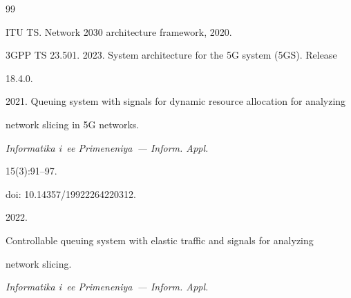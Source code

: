 




\renewcommand{\bibname}{\protect\rmfamily References}







{\small\frenchspacing


{ %




\begin{thebibliography}{99}







ITU TS. Network 2030 architecture framework, 2020.







3GPP TS 23.501. 2023. System architecture for the 5G system (5GS). Release 


18.4.0.









2021. Queuing system with signals for dynamic resource allocation for analyzing 


network slicing in 5G networks.


\textit{Informatika i~ee Primeneniya~--- Inform. Appl.}


15(3):91--97.


doi: 10.14357\!\!/19922264220312.









2022.


Controllable queuing system with elastic traffic and signals for analyzing 


network slicing.


\textit{Informatika i~ee Primeneniya~--- Inform. Appl.}



\end{thebibliography}}}

